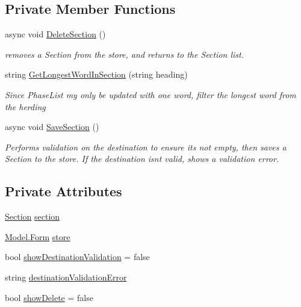 \subsection*{Private Member Functions}
\begin{DoxyCompactItemize}
\item 
async void \mbox{\hyperlink{class_listen_to_me_1_1_view_model_1_1_section_view_model_a066a3b114a5e6c0eeab2d198edd01e8c}{Delete\+Section}} ()
\begin{DoxyCompactList}\small\item\em removes a Section from the store, and returns to the Section list. \end{DoxyCompactList}\item 
string \mbox{\hyperlink{class_listen_to_me_1_1_view_model_1_1_section_view_model_a23907ae918b929a5135c1fd45772a98d}{Get\+Longest\+Word\+In\+Section}} (string heading)
\begin{DoxyCompactList}\small\item\em Since Phase\+List my only be updated with one word, filter the longest word from the herding \end{DoxyCompactList}\item 
async void \mbox{\hyperlink{class_listen_to_me_1_1_view_model_1_1_section_view_model_ad4c6cb932c883814993d3f1cc6b8b0f2}{Save\+Section}} ()
\begin{DoxyCompactList}\small\item\em Performs validation on the destination to ensure it\textquotesingle{}s not empty, then saves a Section to the store. If the destination isn\textquotesingle{}t valid, shows a validation error. \end{DoxyCompactList}\end{DoxyCompactItemize}
\subsection*{Private Attributes}
\begin{DoxyCompactItemize}
\item 
\mbox{\hyperlink{class_listen_to_me_1_1_view_model_1_1_section_view_model_ac1ac47e03f46b5fe9945f66cfbb03fa7}{Section}} \mbox{\hyperlink{class_listen_to_me_1_1_view_model_1_1_section_view_model_ac1067b4fd318f072ace0c5fdb9be744a}{section}}
\item 
\mbox{\hyperlink{class_listen_to_me_1_1_model_1_1_form}{Model.\+Form}} \mbox{\hyperlink{class_listen_to_me_1_1_view_model_1_1_section_view_model_af8a79aa8edbec7bff25750aec728dbef}{store}}
\item 
bool \mbox{\hyperlink{class_listen_to_me_1_1_view_model_1_1_section_view_model_a1decfa9737e0cefb15a6e49fdc2c1833}{show\+Destination\+Validation}} = false
\item 
string \mbox{\hyperlink{class_listen_to_me_1_1_view_model_1_1_section_view_model_a3b691d4a11c695f3c7d14250f18c63ef}{destination\+Validation\+Error}}
\item 
bool \mbox{\hyperlink{class_listen_to_me_1_1_view_model_1_1_section_view_model_a1ba78b6bf4b9e5c7ecd8b9d17d11d159}{show\+Delete}} = false
\end{DoxyCompactItemize}
